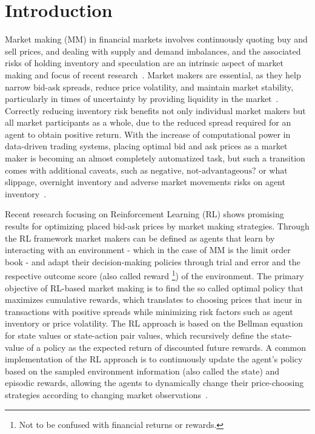 \section{Introduction}
\label{sec:introduction}

Market making (MM) in financial markets involves continuously quoting buy and sell prices, and dealing with supply and demand imbalances,
and the associated risks of holding inventory and speculation are an intrinsic aspect of market making and focus of recent research~\cite{Cartea2015, Gasperov2021}.
Market makers are essential, as they help narrow bid-ask spreads, reduce price volatility, and maintain market stability,
particularly in times of uncertainty by providing liquidity in the market~\cite{Glosten1985, OHara1995}.
Correctly reducing inventory risk benefits not only individual market makers but all market participants as a whole, 
due to the reduced spread required for an agent to obtain positive return.
With the increase of computational power in data-driven trading systems, 
placing optimal bid and ask prices as a market maker is becoming an almost completely automatized task,
but such a transition comes with additional caveats, such as $\text{negative, not-advantageous? or what}$ slippage, overnight inventory and adverse market movements risks on agent inventory~\cite{Cartea2015, Avellaneda2008}.

Recent research focusing on Reinforcement Learning (RL) shows promising results for optimizing placed bid-ask prices by market making strategies.
Through the RL framework market makers can be defined as agents that learn by interacting with an environment - which in the case of MM is the limit order book -
and adapt their decision-making policies through trial and error and the respective outcome score
(also called reward \footnote{Not to be confused with financial returns or rewards.}) of the environment.
The primary objective of RL-based market making is to find the so called optimal policy that maximizes cumulative rewards,
which translates to choosing prices that incur in transactions with positive spreads while minimizing risk factors such as agent inventory or price volatility.
The RL approach is based on the Bellman equation for state values or state-action pair values,
which recursively define the state-value of a policy as the expected return of discounted future rewards.
A common implementation of the RL approach is to continuously update the agent's policy based on the sampled environment information (also called the state) and episodic rewards,
allowing the agents to dynamically change their price-choosing strategies according to changing market observations~\cite{Sutton2018}.

